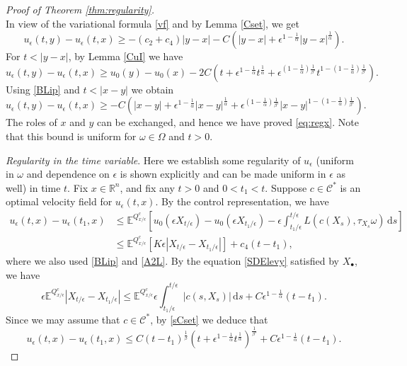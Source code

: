 \documentclass[11pt,reqno]{amsart}
\theoremstyle{definition}
\theoremstyle{remark}
\numberwithin{equation}{section}
\newcommand{\eps}{\epsilon}
\newcommand{\R}{{\mathbb{R}}}
\begin{document}
\begin{proof}[Proof of Theorem \ref{thm:regularity}]
\begin{equation*}
\end{equation*}
In view of the variational formula \eqref{vf} and by Lemma \ref{Cset}, we get
\begin{equation*}
u_\eps(t,y)-u_\eps(t,x) \ge -(c_2+c_4)|y-x| - C(|y-x|+\eps^{1-\frac1\alpha}|y-x|^{\frac1\alpha}).
\end{equation*}
For $t< |y-x|$, by Lemma \ref{CuI} we have
\begin{equation*}
    u_\eps(t,y)-u_\eps(t,x) \ge u_0(y) - u_0(x) - 2C\left(t + \eps^{1-\frac1\alpha} t^{\frac1\alpha} + \eps^{(1-\frac1\alpha)\frac{1}{\beta'}} t^{1-(1-\frac1\alpha)\frac{1}{\beta'}}\right).
\end{equation*}
Using \eqref{BLip} and $t< |x-y|$ we obtain
\begin{equation*}
    u_\eps(t,y)-u_\eps(t,x) \ge -C\left(|x-y| +\eps^{1-\frac1\alpha} |x-y|^{\frac1\alpha} + \eps^{(1-\frac1\alpha)\frac{1}{\beta'}} |x-y|^{1-(1-\frac1\alpha)\frac{1}{\beta'}}\right).
\end{equation*}
The roles of $x$ and $y$ can be exchanged, and hence we have proved \eqref{eq:regx}. Note that this bound is uniform for $\omega \in \Omega$ and $t>0$.

\medskip

\emph{Regularity in the time variable}. Here we establish some regularity of $u_\eps$ (uniform in $\omega$ and dependence on $\eps$ is shown explicitly and can be made uniform in $\eps$ as well) in time $t$. Fix $x\in \R^n$, and fix any $t>0$ and $0< t_1<t$. Suppose $c\in \mathscr{C}^*$ is an optimal velocity field for $u_\eps(t,x)$. By the control representation, we have
\begin{equation*}
\begin{aligned}
    u_\eps(t,x)-u_\eps(t_1,x) &\le \mathbb{E}^{Q^c_{x/\eps}}\left[u_0(\eps X_{t/\eps}) - u_0(\eps X_{t_1/\eps}) - \eps \int_{t_1/\eps}^{t/\eps} L(c(X_s),\tau_{X_s}
    \omega)\,\mathrm{d}s\right]\\
    &\le \mathbb{E}^{Q^c_{x/\eps}}\left[ K\eps |X_{t/\eps}-X_{t_1/\eps}|\right] + c_4(t-t_1),
    \end{aligned}
\end{equation*}
where we also used \eqref{BLip} and \eqref{A2L}. By the equation \eqref{SDElevy} satisfied by $X_\bullet$, we have
\begin{equation*}
    \eps \mathbb{E}^{Q^c_{x/\eps}} |X_{t/\eps}-X_{t_1/\eps}| \le \mathbb{E}^{Q^c_{x/\eps}} \eps \int_{t_1/\eps}^{t/\eps} |c(s,X_s)|\,\mathrm{d}s + C\eps^{1-\frac1\alpha}(t-t_1). 
\end{equation*}
Since we may assume that $c\in \mathscr{C}^*$, by \eqref{sCset} we deduce that
\begin{equation*}
    u_\eps(t,x)-u_\eps(t_1,x) \le C(t-t_1)^{\frac1\beta}(t + \epsilon^{1-\frac{1}{\alpha}} t^{\frac{1}{\alpha}})^{\frac{1}{\beta'}} + C\eps^{1-\frac1\alpha}(t-t_1).
\end{equation*}


\end{proof}
\end{document}
